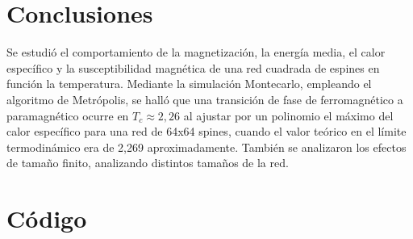 \documentclass[twocolumn,Spanish,a4paper,11pt]{article}
\begin{document}
\section{Conclusiones}

Se estudió el comportamiento de la magnetización,
la energía media, el calor específico y la susceptibilidad
magnética de una red cuadrada de espines en función
la temperatura. Mediante la simulación Montecarlo,
empleando el algoritmo de Metrópolis, se halló que una
transición de fase de ferromagnético a paramagnético
ocurre en $T_c\approx2,26$ al ajustar por un polinomio el máximo del calor específico para una red de 64x64 spines, cuando el valor teórico en el límite termodinámico
era de 2,269 aproximadamente. También se analizaron los
efectos de tamaño finito, analizando distintos tamaños
de la red.

\onecolumn
\section{Código}
\end{document}
